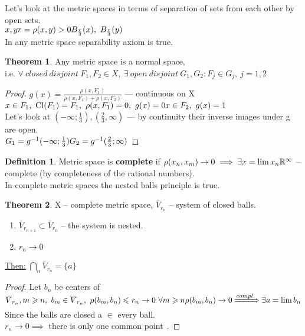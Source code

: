 \documentclass[12pt, fleqn]{article}
\theoremstyle{definition}
\newtheorem*{defn}{Definition}
\theoremstyle{break}
\newtheorem{thm}{Theorem}[section]
\theoremstyle{theorem}
\renewcommand\leq{\leqslant}
\renewcommand\geq{\geqslant}
\newcommand{\R}{\mathbb{R}}
\DeclareMathOperator{\clOp}{Cl}
\newcommand{\cl}[1]{\clOp({#1})}
\begin{document}
Let's look at the metric spaces in terms of separation of sets from each other by open sets. \\
$x, y \\
r = \rho(x, y) > 0 \\
B_{\frac{r}{3}}(x),\ B_{\frac{r}{3}}(y)$ \\
In any metric space separability axiom is true.
\begin{thm}
  Any metric space is a normal space, \\i.e.
  $\forall\ closed\ disjoint\ F_1, F_2 \in X,\ \exists\ open\ disjoint\ G_1, G_2\colon F_j \in G_j,\ j = 1, 2$
\end{thm}
\begin{proof}
  $g(x) = \frac{\rho(x, F_1)}{\rho(x, F_1) + \rho(x, F_2)}$ --- continuous on X \\
  $x \in F_1,\ \cl{F_1} = F_1,\ \rho(x, F_1) = 0,\ g(x) = 0 \\ 
  x \in F_2,\ g(x) = 1$ \\
  Let's look at $(-\infty; \frac{1}{3}), (\frac{2}{3}, \infty)$ --- by continuity their inverse images under g are open. \\
  $G_1 = g^{-1}(-\infty; \frac{1}{3}) \\
  G_2 = g^{-1}(\frac{2}{3}; \infty)\qedhere$
\end{proof}
\begin{defn}
  Metric space is \textbf{complete} if $\rho(x_n, x_m) \to 0 \implies \exists x = \lim x_n \\
  \R^\infty$ -- complete (by completeness of the rational numbers). \\
  In complete metric spaces the nested balls principle is true.
\end{defn}
\begin{thm}
  X -- complete metric space, $\overline{V}_{r_n}$ -- system of closed balls. \\
  \begin{enumerate}
      \item $\overline{V}_{r_{n + 1}} \subset \overline{V}_{r_n}$ -- the system is nested.
      \item $r_n \to 0$
    \end{enumerate}
  \underline{Then:} $\bigcap\limits_n \overline{V}_{r_n} = \{a\}$
\end{thm}
\begin{proof}
  Let $b_n$ be centers of $\overline{V}_{r_n}, \\
  m \geq n,\ b_m \in \overline{V}_{r_n},\ \rho(b_m, b_n) \leq r_n \to 0\ \forall m \geq n \\
  \rho(b_m, b_n) \to 0 \xRightarrow{compl.} \exists a = \lim b_n$
  Since the balls are closed a $\in$ every ball. \\
  $r_n \to 0 \implies$ there is only one common point $\qedhere$.
\end{proof}
\end{document}
